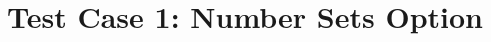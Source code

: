 \documentclass{article}
\begin{document}
\section{Test Case 1: Number Sets Option}
    \Z
    \Q
    \R 
\end{document}
